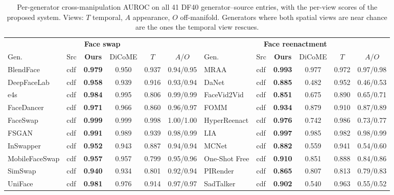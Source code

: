 \begin{table}[t]
\centering
\caption{Per-generator cross-manipulation AUROC on all 41 DF40 generator--source entries, with the per-view scores of the proposed system. Views: $T$ temporal, $A$ appearance, $O$ off-manifold. Generators where both spatial views are near chance are the ones the temporal view rescues.}
\label{tab:df40gen}
\setlength{\tabcolsep}{3.5pt}
\footnotesize
\begin{tabular}{llcccc@{\hskip 10pt}llcccc}
\toprule
\multicolumn{6}{c}{\textbf{Face swap}} & \multicolumn{6}{c}{\textbf{Face reenactment}} \\
\cmidrule(lr){1-6}\cmidrule(lr){7-12}
Gen. & Src & \textbf{Ours} & DiCoME & $T$ & $A$/$O$ & Gen. & Src & \textbf{Ours} & DiCoME & $T$ & $A$/$O$ \\
\midrule
BlendFace & cdf & \textbf{0.979} & 0.950 & 0.937 & 0.94/0.95 & MRAA & cdf & \textbf{0.993} & 0.977 & 0.972 & 0.97/0.98 \\
DeepFaceLab & cdf & \textbf{0.958} & 0.939 & 0.916 & 0.93/0.94 & DaNet & cdf & \textbf{0.885} & 0.482 & 0.952 & 0.46/0.53 \\
e4s & cdf & \textbf{0.984} & 0.995 & 0.806 & 0.99/0.99 & FaceVid2Vid & cdf & \textbf{0.851} & 0.675 & 0.890 & 0.65/0.71 \\
FaceDancer & cdf & \textbf{0.971} & 0.966 & 0.860 & 0.96/0.97 & FOMM & cdf & \textbf{0.934} & 0.879 & 0.910 & 0.87/0.89 \\
FaceSwap & cdf & \textbf{0.999} & 0.999 & 0.998 & 1.00/1.00 & HyperReenact & cdf & \textbf{0.976} & 0.742 & 0.986 & 0.73/0.77 \\
FSGAN & cdf & \textbf{0.991} & 0.989 & 0.939 & 0.98/0.99 & LIA & cdf & \textbf{0.997} & 0.985 & 0.982 & 0.98/0.99 \\
InSwapper & cdf & \textbf{0.952} & 0.943 & 0.887 & 0.94/0.94 & MCNet & cdf & \textbf{0.882} & 0.559 & 0.941 & 0.54/0.60 \\
MobileFaceSwap & cdf & \textbf{0.957} & 0.957 & 0.799 & 0.95/0.96 & One-Shot Free & cdf & \textbf{0.910} & 0.851 & 0.888 & 0.84/0.86 \\
SimSwap & cdf & \textbf{0.940} & 0.934 & 0.801 & 0.92/0.94 & PIRender & cdf & \textbf{0.865} & 0.807 & 0.813 & 0.79/0.83 \\
UniFace & cdf & \textbf{0.981} & 0.976 & 0.914 & 0.97/0.97 & SadTalker & cdf & \textbf{0.902} & 0.540 & 0.963 & 0.55/0.52 \\

\end{tabular}
\end{table}
